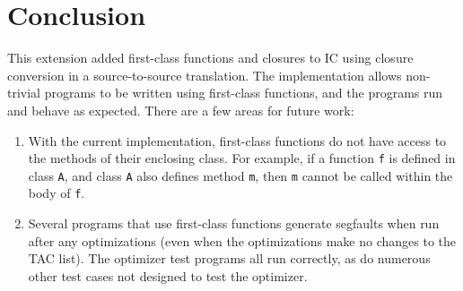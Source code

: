 \documentclass{article}
\begin{document}
\section{Conclusion}
\label{conclusion}
This extension added first-class functions and closures to IC using closure conversion in a source-to-source translation. The implementation allows non-trivial programs to be written using first-class functions, and the programs run and behave as expected. There are a few areas for future work:
\begin{enumerate}
    \item With the current implementation, first-class functions do not have access to the methods of their enclosing class. For example, if a function \texttt{f} is defined in class \texttt{A}, and class \texttt{A} also defines method \texttt{m}, then \texttt{m} cannot be called within the body of \texttt{f}.
    \item Several programs that use first-class functions generate segfaults when run after any optimizations (even when the optimizations make no changes to the TAC list). The optimizer test programs all run correctly, as do numerous other test cases not designed to test the optimizer.
\end{enumerate}

\medskip
 


\end{document}
